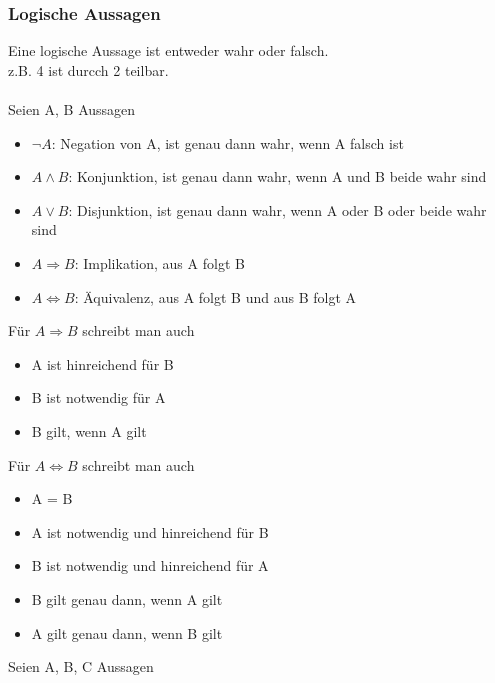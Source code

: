 \documentclass{article}
\begin{document}
	\subsubsection{Logische Aussagen}
	Eine logische Aussage ist entweder wahr oder falsch.\\
	z.B. 4 ist durcch 2 teilbar.\\
	\\
	Seien A, B Aussagen
	\begin{itemize}
	\item $\lnot A$: Negation von A, ist genau dann wahr, wenn A falsch ist
	\item $A \land B$: Konjunktion, ist genau dann wahr, wenn A und B beide wahr sind
	\item $A \lor B$: Disjunktion, ist genau dann wahr, wenn A oder B oder beide wahr sind
	\item $A \Rightarrow B$: Implikation, aus A folgt B
	\item $A \Leftrightarrow B$: Äquivalenz, aus A folgt B und aus B folgt A
	\end{itemize}
	Für $A \Rightarrow B$ schreibt man auch
	\begin{itemize}
	\item A ist hinreichend für B
	\item B ist notwendig für A
	\item B gilt, wenn A gilt
	\end{itemize}
	Für $A \Leftrightarrow B$ schreibt man auch
	\begin{itemize}
	\item A = B
	\item A ist notwendig und hinreichend für B
	\item B ist notwendig und hinreichend für A
	\item B gilt genau dann, wenn A gilt
	\item A gilt genau dann, wenn B gilt
	\end{itemize}
	Seien A, B, C Aussagen
\end{document}
